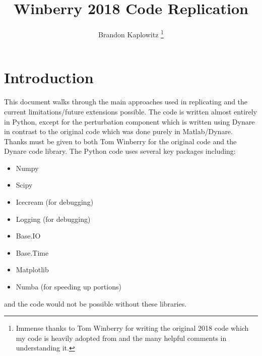 \documentclass[11pt]{article}
\title{Winberry 2018 Code Replication}
\author{Brandon Kaplowitz \thanks{Immense thanks to Tom Winberry for writing the original 2018 code which my code is heavily adopted from and the many helpful comments in understanding it.}}
\begin{document}
\maketitle
\section{Introduction}
This document walks through the main approaches used in replicating \cite{Winberry2018} and the current limitations/future extensions possible. The code is written almost entirely in Python, except for the perturbation component which is written using Dynare in contrast to the original code which was done purely in Matlab/Dynare. Thanks must be given to both Tom Winberry for the original code and the Dynare code library. The Python code uses several key packages including:
\begin{itemize}
\item Numpy 
\item Scipy
\item Icecream (for debugging)
\item Logging (for debugging)
\item Base.IO
\item Base.Time
\item Matplotlib
\item Numba (for speeding up portions)	
\end{itemize}
and the code would not be possible without these libraries.
\end{document}
